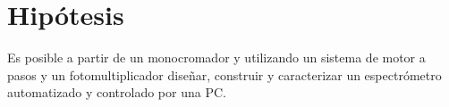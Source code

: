 \chapter*{Hipótesis}
Es posible a partir de un monocromador y utilizando un sistema de motor a pasos y un fotomultiplicador diseñar, construir y caracterizar un espectrómetro automatizado y controlado por una PC.
